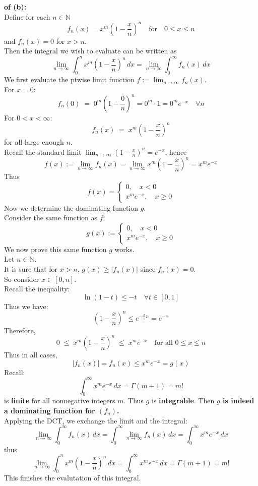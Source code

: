 \documentclass[lang=cn,11pt]{elegantbook}
\begin{document}
\begin{solution}
    \textbf{of (b):}\\
Define for each $n \in \mathbb{N}$ \[
f_n(x) = x^m \left(1 - \frac{x}{n}\right)^n 
\quad \text{for} \quad 0 \le x \le n
\]
and $f_n(x) = 0$ for $x > n$.\\
Then the integral we wish to evaluate can be written as \[
 \lim_{n\to \infty} \int_0^n x^m \left(1 - \frac{x}{n}\right)^n \, dx  = \lim_{n\to \infty} 
\int_0^\infty f_n(x) \, dx
\]
We first evaluate the ptwise limit function $f:= \lim_{n\to \infty} f_n(x)$.\\
For \(x = 0\): \[
   f_n(0) \;=\; 0^m \left(1 - \frac{0}{n}\right)^n = 0^m \cdot 1 =0^m e^{-x} \quad \forall n
   \]
For \(0 < x < \infty\): \[
   f_n(x) \;=\; x^m \left(1 - \frac{x}{n}\right)^n
   \]
for all large enough $n$. \\
Recall the standard limit \(\lim_{n \to \infty} \left(1 - \tfrac{x}{n}\right)^n = e^{-x}\), hence \[
  f(x) := \lim_{n \to \infty} f_n(x) = \lim_{n \to \infty}   x^m \left(1 - \frac{x}{n}\right)^n = 
   x^m e^{-x}
   \]
Thus \[
f(x) = \begin{cases}
    0, \quad x< 0 \\
       x^m e^{-x}, \quad x \geq 0
\end{cases}
\]
Now we determine the dominating function $g$.\\
Consider the same function as $f$:
\[
g(x) :=  \begin{cases}
    0,\quad x< 0\\
    x^m  e^{-x}, \quad x\geq 0
\end{cases}
\]
We now prove this same function $g$ works.\\
Let $n \in \mathbb{N}$.\\
It is sure that for $x > n$, $g(x) \geq |f_n(x)|$ since $f_n(x) = 0$.\\
So consider $x\in[0,n]$.\\
Recall the inequality: \[ \ln(1-t)\le -t \quad \forall t\in[0,1]\]
Thus we have: 
\[
\left(1 - \frac{x}{n}\right)^n \leq
e^{-\frac{x}{n}n} =
e^{-x}
\]
Therefore,
\[
0 
\;\le\;
x^m \left(1 - \frac{x}{n}\right)^n 
\;\le\;
x^m e^{-x}
\quad
\text{for all } 0 \le x \le n
\]
Thus in all cases,
\[|f_n(x)|=f_n(x) \leq 
x^m e^{-x} =
g(x)
\]
Recall:
\[
\int_0^\infty x^m e^{-x}\,dx = \Gamma(m+1) = m!
\]
is \textbf{finite} for all nonnegative integers \(m\). Thus \(g\) is \textbf{integrable}. Then \textbf{$g$ is indeed a dominating function for $(f_n)$.} \\
Applying the DCT, we exchange the limit and the integral:
\[
\lim_{n \to \infty} \int_0^\infty f_n(x)\, dx =
\int_0^\infty \lim_{n\to\infty} f_n(x)\, dx =
\int_0^\infty x^m e^{-x}\, dx
\] thus
\[
\lim_{n \to \infty} \int_0^n x^m \left(1 - \frac{x}{n}\right)^n \, dx =
\int_0^\infty x^m e^{-x}\, dx = \Gamma(m+1) = m!
\] This finishes the evalutation of this integral.
\end{solution}
\end{document}
